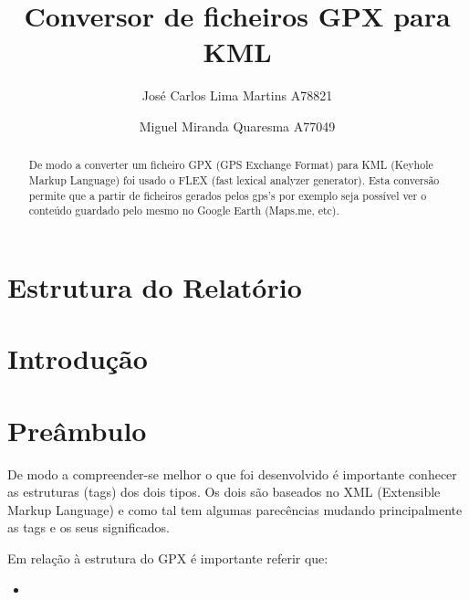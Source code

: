 \documentclass{llncs}
\begin{document}
 \mainmatter
\title{Conversor de ficheiros GPX para KML}
\author{José Carlos Lima Martins A78821 \and
        Miguel Miranda Quaresma A77049}

\maketitle

\justify

\begin{abstract}
De modo a converter um ficheiro GPX (GPS Exchange Format) para KML (Keyhole Markup Language) foi usado o FLEX (fast lexical analyzer generator). Esta conversão permite que a partir de ficheiros gerados pelos gps's por exemplo seja possível ver o conteúdo guardado pelo mesmo no Google Earth (Maps.me, etc).
\end{abstract}

\section{Estrutura do Relatório}

\section{Introdução}

\section{Preâmbulo}\label{pb}
De modo a compreender-se melhor o que foi desenvolvido é importante conhecer as estruturas (tags) dos dois tipos. Os dois são baseados no XML (Extensible Markup Language) e como tal tem algumas parecências mudando principalmente as tags e os seus significados.

Em relação à estrutura do GPX é importante referir que:
\begin{itemize}
    \item
\end{itemize}
\end{document}
